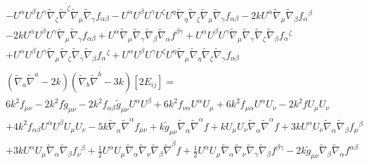 \documentclass[10pt,letterpaper]{article}
\numberwithin{equation}{section}
\begin{document}
\begin{eqnarray}
&& -  U^{\alpha } U^{\beta } U^{\gamma } \tilde{\nabla}_{\zeta }\tilde{\nabla}^{\zeta }\tilde{\nabla}_{\mu }\tilde{\nabla}_{\gamma }f_{\alpha \beta } -  U^{\alpha } U^{\beta } U^{\gamma } U^{\zeta } U^{\eta } \tilde{\nabla}_{\eta }\tilde{\nabla}_{\zeta }\tilde{\nabla}_{\mu }\tilde{\nabla}_{\gamma }f_{\alpha \beta } - 2 k U^{\alpha } \tilde{\nabla}_{\mu }\tilde{\nabla}_{\beta }f_{\alpha }{}^{\beta } \nonumber \\ 
&& - 2 k U^{\alpha } U^{\beta } U^{\gamma } \tilde{\nabla}_{\mu }\tilde{\nabla}_{\gamma }f_{\alpha \beta } + U^{\alpha } \tilde{\nabla}_{\mu }\tilde{\nabla}_{\gamma }\tilde{\nabla}_{\beta }\tilde{\nabla}_{\alpha }f^{\beta \gamma } + U^{\alpha } U^{\beta } U^{\gamma } \tilde{\nabla}_{\mu }\tilde{\nabla}_{\gamma }\tilde{\nabla}_{\zeta }\tilde{\nabla}_{\beta }f_{\alpha }{}^{\zeta } \nonumber \\ 
&& + U^{\alpha } U^{\beta } U^{\gamma } \tilde{\nabla}_{\mu }\tilde{\nabla}_{\zeta }\tilde{\nabla}_{\gamma }\tilde{\nabla}_{\beta }f_{\alpha }{}^{\zeta } + U^{\alpha } U^{\beta } U^{\gamma } U^{\zeta } U^{\eta } \tilde{\nabla}_{\mu }\tilde{\nabla}_{\eta }\tilde{\nabla}_{\zeta }\tilde{\nabla}_{\gamma }f_{\alpha \beta }
\\ \nonumber\\
&&(\tilde\nabla_a\tilde\nabla^a-2k)(\tilde\nabla_b\tilde\nabla^b -3k)[2E_{ij}]=
\nonumber\\
&&6 k^2 f_{\mu \nu } - 2 k^2 f \tilde{g}_{\mu \nu } - 2 k^2 f_{\alpha \beta } \tilde{g}_{\mu \nu } U^{\alpha } U^{\beta } + 6 k^2 f_{\nu \alpha } U^{\alpha } U_{\mu } + 6 k^2 f_{\mu \alpha } U^{\alpha } U_{\nu } - 2 k^2 f U_{\mu } U_{\nu } \nonumber \\ 
&& + 4 k^2 f_{\alpha \beta } U^{\alpha } U^{\beta } U_{\mu } U_{\nu } - 5 k \tilde{\nabla}_{\alpha }\tilde{\nabla}^{\alpha }f_{\mu \nu } + k \tilde{g}_{\mu \nu } \tilde{\nabla}_{\alpha }\tilde{\nabla}^{\alpha }f + k U_{\mu } U_{\nu } \tilde{\nabla}_{\alpha }\tilde{\nabla}^{\alpha }f + 3 k U^{\alpha } U_{\nu } \tilde{\nabla}_{\alpha }\tilde{\nabla}_{\beta }f_{\mu }{}^{\beta } \nonumber \\ 
&& + 3 k U^{\alpha } U_{\mu } \tilde{\nabla}_{\alpha }\tilde{\nabla}_{\beta }f_{\nu }{}^{\beta } + \tfrac{1}{2} U^{\alpha } U_{\mu } \tilde{\nabla}_{\alpha }\tilde{\nabla}_{\nu }\tilde{\nabla}_{\beta }\tilde{\nabla}^{\beta }f + \tfrac{1}{2} U^{\alpha } U_{\mu } \tilde{\nabla}_{\alpha }\tilde{\nabla}_{\nu }\tilde{\nabla}_{\gamma }\tilde{\nabla}_{\beta }f^{\beta \gamma } - 2 k \tilde{g}_{\mu \nu } \tilde{\nabla}_{\beta }\tilde{\nabla}_{\alpha }f^{\alpha \beta } \nonumber \\ 

\end{eqnarray}
\end{document}

